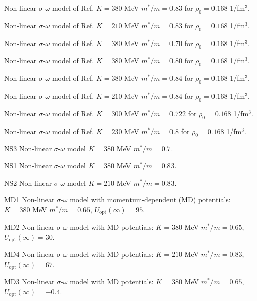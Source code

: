 \documentclass[]{article}
\newenvironment{entry}%
{\begin{list}{}{\setlength{\topsep}{0mm} \setlength{\itemsep}{0mm}
\setlength{\parskip}{0mm} \setlength{\parsep}{0mm}
\setlength{\leftmargin}{20mm} \setlength{\rightmargin}{0mm}
\setlength{\labelwidth}{18mm} \setlength{\labelsep}{2mm}}}%
{\end{list}}
\newenvironment{subentry}%
{\begin{list}{}{\setlength{\topsep}{0mm} \setlength{\itemsep}{0mm}
\setlength{\parskip}{0mm} \setlength{\parsep}{0mm}
\setlength{\leftmargin}{10mm} \setlength{\rightmargin}{0mm}
\setlength{\labelwidth}{18mm} \setlength{\labelsep}{2mm}}}%
{\end{list}}
\newcommand{\itemt}[1]{\item[{\tt #1}\hfill]}
\begin{document}
\begin{entry}
\begin{subentry}
    \itemt{$=114$ :} Non-linear $\sigma$-$\omega$ model of Ref.\cite{Lang} 
        $K=380$ MeV $m^*/m=0.83$ for $\rho_0=0.168$ 1/fm$^3$.
    \itemt{$=115$ :} Non-linear $\sigma$-$\omega$ model of Ref.\cite{Lang} 
        $K=210$ MeV $m^*/m=0.83$ for $\rho_0=0.168$ 1/fm$^3$.
    \itemt{$=116$ :} Non-linear $\sigma$-$\omega$ model of Ref.\cite{Lang} 
        $K=380$ MeV $m^*/m=0.70$ for $\rho_0=0.168$ 1/fm$^3$.

    \itemt{$=117$ :} Non-linear $\sigma$-$\omega$ model of Ref.\cite{Lang} 
        $K=380$ MeV $m^*/m=0.80$ for $\rho_0=0.168$ 1/fm$^3$.

    \itemt{$=119$ :} Non-linear $\sigma$-$\omega$ model of Ref.\cite{Lang} 
        $K=380$ MeV $m^*/m=0.84$ for $\rho_0=0.168$ 1/fm$^3$.
    \itemt{$=120$ :} Non-linear $\sigma$-$\omega$ model of Ref.\cite{Lang} 
        $K=210$ MeV $m^*/m=0.84$ for $\rho_0=0.168$ 1/fm$^3$.
    \itemt{$=123$ :} Non-linear $\sigma$-$\omega$ model of Ref.\cite{Lang} 
        $K=300$ MeV $m^*/m=0.722$ for $\rho_0=0.168$ 1/fm$^3$.
    \itemt{$=126$ :} Non-linear $\sigma$-$\omega$ model of Ref.\cite{Lang} 
        $K=230$ MeV $m^*/m=0.8$ for $\rho_0=0.168$ 1/fm$^3$.

    \itemt{$=152$ :} NS3 Non-linear $\sigma$-$\omega$ model
    $K=380$ MeV $m^*/m=0.7$.

    \itemt{$=153$ :} NS1 Non-linear $\sigma$-$\omega$ model
    $K=380$ MeV $m^*/m=0.83$.
    \itemt{$=154$ :} NS2 Non-linear $\sigma$-$\omega$ model
    $K=210$ MeV $m^*/m=0.83$.

    \itemt{$=203$ :} MD1 Non-linear $\sigma$-$\omega$ model with
    momentum-dependent (MD) potentials:\\ $K=380$ MeV $m^*/m=0.65$,
     $U_\mathrm{opt}(\infty)=95$.
    \itemt{$=204$ :} MD2 Non-linear $\sigma$-$\omega$ model with
    MD potentials:
    $K=380$ MeV $m^*/m=0.65$,
     $U_\mathrm{opt}(\infty)=30$.

    \itemt{$=210$ :} MD4 Non-linear $\sigma$-$\omega$ model with
    MD potentials: $K=210$ MeV $m^*/m=0.83$,
     $U_\mathrm{opt}(\infty)=67$.

    \itemt{$=212$ :} MD3 Non-linear $\sigma$-$\omega$ model with
    MD potentials:
    $K=380$ MeV $m^*/m=0.65$,
    $U_\mathrm{opt}(\infty)=-0.4$.




 \end{subentry}


\end{entry}
\end{document}
